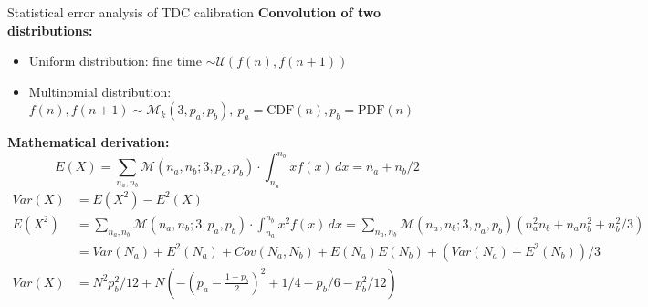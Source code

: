 \documentclass{ikpKoeln}
\begin{document}
\begin{frame}[t]{Statistical error analysis of TDC calibration}
	\flushleft \textbf{Convolution of two distributions:}
	\begin{itemize}
		\item Uniform distribution: fine time $\sim \mathcal{U}(f(n), f(n + 1))$
		\item Multinomial distribution: $f(n), f(n+1) \sim \mathcal{M}_k(3,p_a, p_b), \ p_a = \text{CDF}(n), p_b = \text{PDF}(n)$
	\end{itemize}

	\pause
	\flushleft \textbf{Mathematical derivation:}
	\scriptsize{
		$$ E(X) = \sum_{n_a, n_b} \mathcal{M}(n_a,n_b;3,p_a, p_b) \cdot \int_{n_a}^{n_b} xf(x) \,dx = \bar{n_a} + \bar{n_b} / 2 $$
	}
	{
		\scriptsize
		\begin{align*}
			Var(X) & = E(X^2) - E^2(X)                                                                                                                                                      \\
			E(X^2) & = \sum_{n_a, n_b} \mathcal{M}(n_a,n_b;3,p_a, p_b) \cdot \int_{n_a}^{n_b} x^2f(x) \,dx = \sum_{n_a, n_b} \mathcal{M}(n_a,n_b;3,p_a, p_b)(n_a^2n_b + n_an_b^2 + n_b^2/3) \\
			       & = Var(N_a) + E^2(N_a) + Cov(N_a, N_b) + E(N_a)E(N_b) + \left(Var(N_a) + E^2(N_b)\right)/3                                                                              \\
			Var(X) & = N^2 p_b^2 / 12 + N \left( -(p_a - \frac{1-p_b}{2})^2 + 1/4 - p_b / 6 - p_b^2 /12 \right)
		\end{align*}
	}%

\end{frame}
\end{document}
